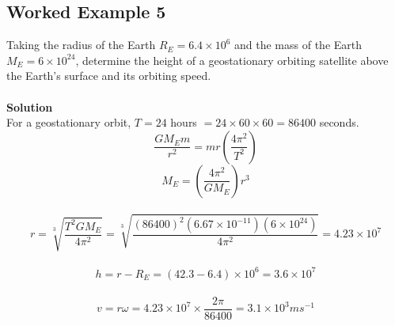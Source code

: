 \documentclass{article}
\begin{document}
\subsection*{Worked Example 5}
Taking the radius of the Earth $R_E=6.4\times10^6$ and the mass of the Earth $M_E=6\times10^24$, determine the height of a geostationary orbiting satellite above the Earth's surface and its orbiting speed.
\\
\\\textbf{Solution}
\\For a geostationary orbit, $T=24$ hours $=24\times60\times60=86400$ seconds.
\begin{equation}
    \frac{GM_Em}{r^2}=mr(\frac{4\pi^2}{T^2})
\end{equation}
\begin{equation}
    M_E=(\frac{4\pi^2}{GM_E}) r^3
\end{equation}
\\
\begin{equation}
    r=\sqrt[3]{\frac{T^2GM_E}{4\pi^2}}=\sqrt[3]{\frac{(86400)^2(6.67\times10^{-11})(6\times10^{24})}{4\pi^2}}=4.23\times10^7
\end{equation}
\\
\begin{equation}
    h=r-R_E=(42.3-6.4)\times10^6=3.6\times10^7
\end{equation}
\\
\begin{equation}
    v=r\omega=4.23\times10^7\times\frac{2\pi}{86400}=3.1\times10^3ms^{-1}
\end{equation}
\end{document}
